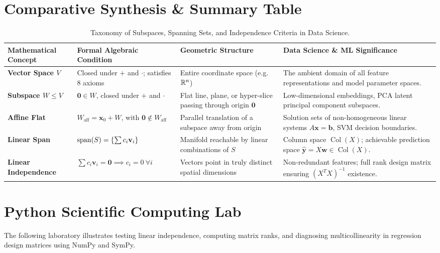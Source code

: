 \section{Comparative Synthesis \& Summary Table}

\begin{table}[htbp]
\centering
\small
\begin{tabular}{p{2.6cm} p{3.2cm} p{3.6cm} p{4.4cm}}
\toprule
\textbf{Mathematical Concept} & \textbf{Formal Algebraic Condition} & \textbf{Geometric Structure} & \textbf{Data Science \& ML Significance} \\
\midrule
\textbf{Vector Space $V$} & Closed under $+$ and $\cdot$; satisfies 8 axioms & Entire coordinate space (e.g. $\mathbb{R}^n$) & The ambient domain of all feature representations and model parameter spaces. \\
\addlinespace
\textbf{Subspace $W \le V$} & $\mathbf{0} \in W$, closed under $+$ and $\cdot$ & Flat line, plane, or hyper-slice passing through origin $\mathbf{0}$ & Low-dimensional embeddings, PCA latent principal component subspaces. \\
\addlinespace
\textbf{Affine Flat} & $W_{\text{aff}} = \mathbf{x}_0 + W$, with $\mathbf{0} \notin W_{\text{aff}}$ & Parallel translation of a subspace away from origin & Solution sets of non-homogeneous linear systems $A\mathbf{x} = \mathbf{b}$, SVM decision boundaries. \\
\addlinespace
\textbf{Linear Span} & $\operatorname{span}(S) = \{\sum c_i \mathbf{v}_i\}$ & Manifold reachable by linear combinations of $S$ & Column space $\operatorname{Col}(X)$; achievable prediction space $\hat{\mathbf{y}} = X\mathbf{w} \in \operatorname{Col}(X)$. \\
\addlinespace
\textbf{Linear Independence} & $\sum c_i \mathbf{v}_i = \mathbf{0} \implies c_i = 0 \ \forall i$ & Vectors point in truly distinct spatial dimensions & Non-redundant features; full rank design matrix ensuring $(X^T X)^{-1}$ existence. \\
\bottomrule
\end{tabular}
\caption{Taxonomy of Subspaces, Spanning Sets, and Independence Criteria in Data Science.}
\end{table}

\section{Python Scientific Computing Lab}

The following laboratory illustrates testing linear independence, computing matrix ranks, and diagnosing multicollinearity in regression design matrices using NumPy and SymPy.

